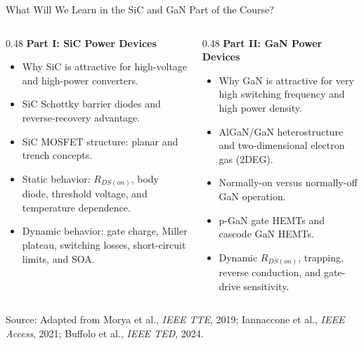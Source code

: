 \begin{frame}{What Will We Learn in the SiC and GaN Part of the Course?}
\begin{columns}[T]
\begin{column}{0.48\textwidth}
\textbf{Part I: SiC Power Devices}
\begin{itemize}
    \item Why SiC is attractive for high-voltage and high-power converters.
    \item SiC Schottky barrier diodes and reverse-recovery advantage.
    \item SiC MOSFET structure: planar and trench concepts.
    \item Static behavior: $R_{DS(on)}$, body diode, threshold voltage, and temperature dependence.
    \item Dynamic behavior: gate charge, Miller plateau, switching losses, short-circuit limits, and SOA.
\end{itemize}
\end{column}

\begin{column}{0.48\textwidth}
\textbf{Part II: GaN Power Devices}
\begin{itemize}
    \item Why GaN is attractive for very high switching frequency and high power density.
    \item AlGaN/GaN heterostructure and two-dimensional electron gas (2DEG).
    \item Normally-on versus normally-off GaN operation.
    \item p-GaN gate HEMTs and cascode GaN HEMTs.
    \item Dynamic $R_{DS(on)}$, trapping, reverse conduction, and gate-drive sensitivity.
\end{itemize}
\end{column}
\end{columns}

\scriptsize
Source: Adapted from Morya et al., \textit{IEEE TTE}, 2019; Iannaccone et al., \textit{IEEE Access}, 2021; Buffolo et al., \textit{IEEE TED}, 2024.
\end{frame}


